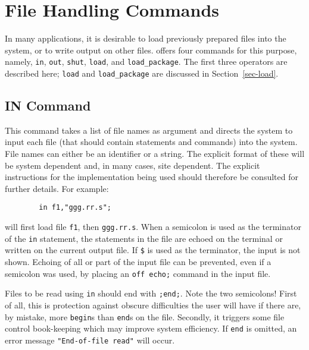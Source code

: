 \chapter{File Handling Commands}

In many applications, it is desirable to load previously prepared {\REDUCE}
files into the system, or to write output on other files. {\REDUCE} offers
four commands for this purpose, namely, \texttt{in}, \texttt{out}, \texttt{shut},
\texttt{load}, and \texttt{load\_package}.  
The first three operators are described here; \texttt{load} and 
\texttt{load\_package} are discussed in Section~\ref{sec-load}.

\section{IN Command}
\hypertarget{command:IN}{}
\hypertarget{switch:ECHO}{}
\hypertarget{reserved:__FILE__}{}
\hypertarget{reserved:__LINE__}{}
This command takes a list of file names as argument and directs the system
to input each file (that should contain {\REDUCE} statements
and commands) into the system.  File names can either be an identifier or
a string.  The explicit format of these will be system dependent and, in
many cases, site dependent.  The explicit instructions for the
implementation being used should therefore be consulted for further
details. For example:
\begin{verbatim}
        in f1,"ggg.rr.s";
\end{verbatim}
will first load file \texttt{f1}, then \texttt{ggg.rr.s}.  When a semicolon is
used as the terminator of the \texttt{in} statement, the statements in the file are
echoed on the terminal or written on the current output file.  If \texttt{\$}
 is used as the terminator, the input is not
shown.  Echoing of all or part of the input file can be prevented, even if
a semicolon was used, by placing an \texttt{off echo;} command
in the input file.

Files to be read using \texttt{in} should end with \texttt{;end;}.  Note the two
semicolons!  First of all, this is protection against obscure difficulties
the user will have if there are, by mistake, more \texttt{begin}s than
\texttt{end}s on the file.  Secondly, it triggers some file control book-keeping
which may improve system efficiency.  If \texttt{end} is omitted, an error
message \texttt{"End-of-file read"} will occur.

